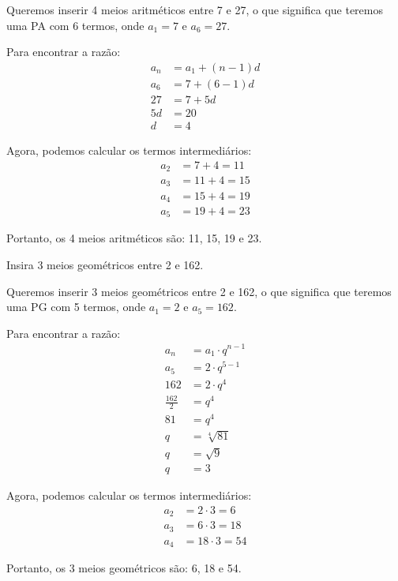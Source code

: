 \documentclass[12pt,a4paper]{article}
\begin{document}
\begin{tcolorbox}[colback=green!5!white,colframe=green!75!black,title=Resolução]
Queremos inserir 4 meios aritméticos entre 7 e 27, o que significa que teremos uma PA com 6 termos, onde $a_1 = 7$ e $a_6 = 27$.

Para encontrar a razão:
\begin{align}
a_n &= a_1 + (n-1)d\\
a_6 &= 7 + (6-1)d\\
27 &= 7 + 5d\\
5d &= 20\\
d &= 4
\end{align}

Agora, podemos calcular os termos intermediários:
\begin{align}
a_2 &= 7 + 4 = 11\\
a_3 &= 11 + 4 = 15\\
a_4 &= 15 + 4 = 19\\
a_5 &= 19 + 4 = 23
\end{align}

Portanto, os 4 meios aritméticos são: 11, 15, 19 e 23.
\end{tcolorbox}

\begin{tcolorbox}[colback=blue!5!white,colframe=blue!75!black,title=Exercício Adicional 8]
Insira 3 meios geométricos entre 2 e 162.
\end{tcolorbox}

\begin{tcolorbox}[colback=green!5!white,colframe=green!75!black,title=Resolução]
Queremos inserir 3 meios geométricos entre 2 e 162, o que significa que teremos uma PG com 5 termos, onde $a_1 = 2$ e $a_5 = 162$.

Para encontrar a razão:
\begin{align}
a_n &= a_1 \cdot q^{n-1}\\
a_5 &= 2 \cdot q^{5-1}\\
162 &= 2 \cdot q^4\\
\frac{162}{2} &= q^4\\
81 &= q^4\\
q &= \sqrt[4]{81}\\
q &= \sqrt{9}\\
q &= 3
\end{align}

Agora, podemos calcular os termos intermediários:
\begin{align}
a_2 &= 2 \cdot 3 = 6\\
a_3 &= 6 \cdot 3 = 18\\
a_4 &= 18 \cdot 3 = 54
\end{align}

Portanto, os 3 meios geométricos são: 6, 18 e 54.
\end{tcolorbox}
\end{document}
